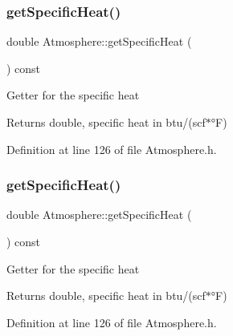 \mbox{\label{class_atmosphere_a59802a10861a58ab0f0f4e0ab8671e14}} 
\subsubsection{\texorpdfstring{get\+Specific\+Heat()}{getSpecificHeat()}\hspace{0.1cm}{\footnotesize\ttfamily [2/3]}}
{\footnotesize\ttfamily double Atmosphere\+::get\+Specific\+Heat (\begin{DoxyParamCaption}{ }\end{DoxyParamCaption}) const\hspace{0.3cm}{\ttfamily [inline]}}

Getter for the specific heat \begin{DoxyReturn}{Returns}
double, specific heat in btu/(scf$\ast$°F) 
\end{DoxyReturn}


Definition at line 126 of file Atmosphere.\+h.

\mbox{\label{class_atmosphere_a59802a10861a58ab0f0f4e0ab8671e14}} 
\subsubsection{\texorpdfstring{get\+Specific\+Heat()}{getSpecificHeat()}\hspace{0.1cm}{\footnotesize\ttfamily [3/3]}}
{\footnotesize\ttfamily double Atmosphere\+::get\+Specific\+Heat (\begin{DoxyParamCaption}{ }\end{DoxyParamCaption}) const\hspace{0.3cm}{\ttfamily [inline]}}

Getter for the specific heat \begin{DoxyReturn}{Returns}
double, specific heat in btu/(scf$\ast$°F) 
\end{DoxyReturn}


Definition at line 126 of file Atmosphere.\+h.

\mbox{\label{class_atmosphere_a3ac0fb0d4fc92edc690e44b40b7018c2}} 
